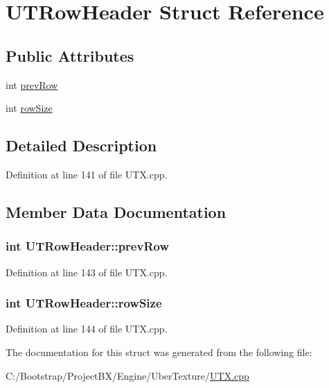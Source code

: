 \hypertarget{struct_u_t_row_header}{
\section{UTRowHeader Struct Reference}
\label{struct_u_t_row_header}
}
\subsection*{Public Attributes}
\begin{CompactItemize}
\item 
int \hyperlink{struct_u_t_row_header_4d32975c587ffacd31610db5a53c8d01}{prevRow}
\item 
int \hyperlink{struct_u_t_row_header_12eda54f2fb4a5032ac56a5e96345eae}{rowSize}
\end{CompactItemize}


\subsection{Detailed Description}


Definition at line 141 of file UTX.cpp.

\subsection{Member Data Documentation}
\hypertarget{struct_u_t_row_header_4d32975c587ffacd31610db5a53c8d01}{
\subsubsection[{prevRow}]{\setlength{\rightskip}{0pt plus 5cm}int {\bf UTRowHeader::prevRow}}}
\label{struct_u_t_row_header_4d32975c587ffacd31610db5a53c8d01}




Definition at line 143 of file UTX.cpp.\hypertarget{struct_u_t_row_header_12eda54f2fb4a5032ac56a5e96345eae}{
\subsubsection[{rowSize}]{\setlength{\rightskip}{0pt plus 5cm}int {\bf UTRowHeader::rowSize}}}
\label{struct_u_t_row_header_12eda54f2fb4a5032ac56a5e96345eae}




Definition at line 144 of file UTX.cpp.

The documentation for this struct was generated from the following file:\begin{CompactItemize}
\item 
C:/Bootstrap/ProjectBX/Engine/UberTexture/\hyperlink{_u_t_x_8cpp}{UTX.cpp}\end{CompactItemize}
